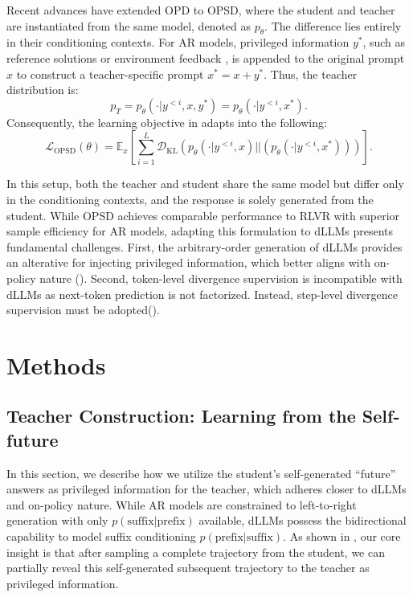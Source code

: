 \documentclass{article}
\begin{document}
Recent advances have extended OPD to OPSD, where the student and teacher are instantiated from the same model, denoted as $p_\theta$. The difference lies entirely in their conditioning contexts. For AR models, privileged information $y^*$, such as reference solutions \citep{zhao2026self} or environment feedback \citep{hubotter2026reinforcement}, is appended to the original prompt $x$ to construct a teacher-specific prompt $x^* = x + y^*$. Thus, the teacher distribution is:
\begin{equation}
    p_T = p_\theta \left( \cdot | y^{<i}, x, y^* \right) = p_\theta \left( \cdot | y^{<i}, x^* \right).
\end{equation}
Consequently, the learning objective in  adapts into the following:
\begin{equation}
    \mathcal{L}_\text{OPSD} (\theta) = \mathbb{E}_x \left[ \sum_{i=1}^L \mathcal{D}_\text{KL} \left(p_\theta \left( \cdot | y^{<i}, x  \right) || \left( p_\theta \left( \cdot | y^{<i}, x^* \right) \right) \right) \right].
\end{equation}

In this setup, both the teacher and student share the same model but differ only in the conditioning contexts, and the response is solely generated from the student. While OPSD achieves comparable performance to RLVR with superior sample efficiency for AR models, adapting this formulation to dLLMs presents fundamental challenges. First, the arbitrary-order generation of dLLMs provides an alterative for injecting privileged information, which better aligns with on-policy nature (). Second, token-level divergence supervision is incompatible with dLLMs as next-token prediction is not factorized. Instead, step-level divergence supervision must be adopted().


\section{Methods}


\subsection{Teacher Construction: Learning from the Self-future} \label{sec3.1}


In this section, we describe how we utilize the student's self-generated ``future'' answers as privileged information for the teacher, which adheres closer to dLLMs and on-policy nature. While AR models are constrained to left-to-right generation with only $p(\text{suffix} | \text{prefix})$ available, dLLMs possess the bidirectional capability to model suffix conditioning $p(\text{prefix} | \text{suffix})$. As shown in , our core insight is that after sampling a complete trajectory from the student, we can partially reveal this self-generated subsequent trajectory to the teacher as privileged information.
\end{document}
